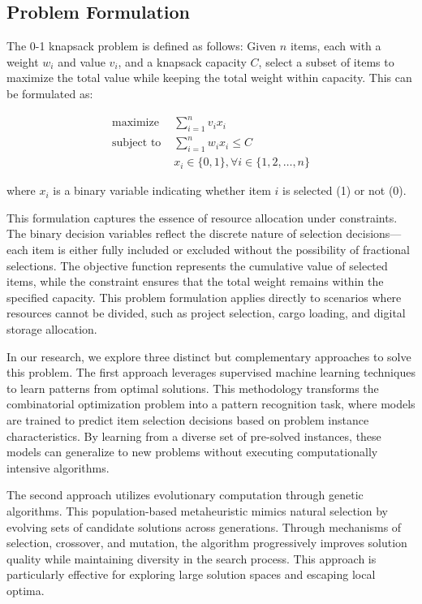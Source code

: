\documentclass[conference, a4paper]{IEEEtran}
\begin{document}
\subsection{Problem Formulation}
The 0-1 knapsack problem is defined as follows: Given $n$ items, each with a weight $w_i$ and value $v_i$, and a knapsack capacity $C$, select a subset of items to maximize the total value while keeping the total weight within capacity. This can be formulated as:

\begin{align}
\text{maximize } & \sum_{i=1}^{n} v_i x_i \\
\text{subject to } & \sum_{i=1}^{n} w_i x_i \leq C \\
& x_i \in \{0, 1\}, \forall i \in \{1, 2, \ldots, n\}
\end{align}

where $x_i$ is a binary variable indicating whether item $i$ is selected (1) or not (0).

This formulation captures the essence of resource allocation under constraints. The binary decision variables reflect the discrete nature of selection decisions—each item is either fully included or excluded without the possibility of fractional selections. The objective function represents the cumulative value of selected items, while the constraint ensures that the total weight remains within the specified capacity. This problem formulation applies directly to scenarios where resources cannot be divided, such as project selection, cargo loading, and digital storage allocation.

In our research, we explore three distinct but complementary approaches to solve this problem. The first approach leverages supervised machine learning techniques to learn patterns from optimal solutions. This methodology transforms the combinatorial optimization problem into a pattern recognition task, where models are trained to predict item selection decisions based on problem instance characteristics. By learning from a diverse set of pre-solved instances, these models can generalize to new problems without executing computationally intensive algorithms.

The second approach utilizes evolutionary computation through genetic algorithms. This population-based metaheuristic mimics natural selection by evolving sets of candidate solutions across generations. Through mechanisms of selection, crossover, and mutation, the algorithm progressively improves solution quality while maintaining diversity in the search process. This approach is particularly effective for exploring large solution spaces and escaping local optima.
\end{document}
